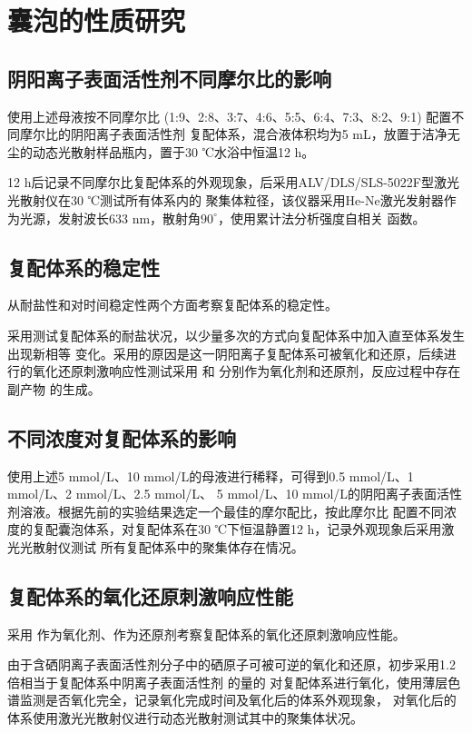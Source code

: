\documentclass[bachelor,fandolfonts,replaceperiod]{jnuthesis}
\begin{document}
    \section{囊泡的性质研究}
    \subsection{阴阳离子表面活性剂不同摩尔比的影响}
    使用上述母液按不同摩尔比 (1:9、2:8、3:7、4:6、5:5、6:4、7:3、8:2、9:1) 配置不同摩尔比的阴阳离子表面活性剂
    复配体系，混合液体积均为5 mL，放置于洁净无尘的动态光散射样品瓶内，置于30 ℃水浴中恒温12 h。
    
    12 h后记录不同摩尔比复配体系的外观现象，后采用ALV/DLS/SLS-5022F型激光光散射仪在30 ℃测试所有体系内的
    聚集体粒径，该仪器采用He-Ne激光发射器作为光源，发射波长633 nm，散射角$90^\circ$，使用累计法分析强度自相关
    函数。
    
    \subsection{复配体系的稳定性}
    从耐盐性和对时间稳定性两个方面考察复配体系的稳定性。
    
    采用测试复配体系的耐盐状况，以少量多次的方式向复配体系中加入直至体系发生出现新相等
    变化。采用的原因是这一阴阳离子复配体系可被氧化和还原，后续进行的氧化还原刺激响应性测试采用
    和  分别作为氧化剂和还原剂，反应过程中存在副产物  的生成。
    
    \subsection{不同浓度对复配体系的影响}
    使用上述5 mmol/L、10 mmol/L的母液进行稀释，可得到0.5 mmol/L、1 mmol/L、2 mmol/L、2.5 mmol/L、
    5 mmol/L、10 mmol/L的阴阳离子表面活性剂溶液。根据先前的实验结果选定一个最佳的摩尔配比，按此摩尔比
    配置不同浓度的复配囊泡体系，对复配体系在30 ℃下恒温静置12 h，记录外观现象后采用激光光散射仪测试
    所有复配体系中的聚集体存在情况。
    
    \subsection{复配体系的氧化还原刺激响应性能}
    采用 作为氧化剂、作为还原剂考察复配体系的氧化还原刺激响应性能。
    
    由于含硒阴离子表面活性剂分子中的硒原子可被可逆的氧化和还原，初步采用1.2倍相当于复配体系中阴离子表面活性剂
    的量的  对复配体系进行氧化，使用薄层色谱监测是否氧化完全，记录氧化完成时间及氧化后的体系外观现象，
    对氧化后的体系使用激光光散射仪进行动态光散射测试其中的聚集体状况。
    
\end{document}
